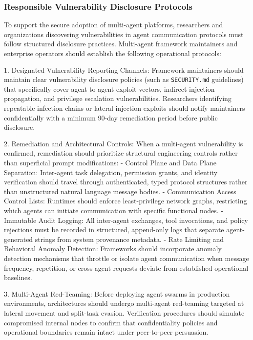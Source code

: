 \documentclass[11pt,a4paper]{article}
\begin{document}
\subsubsection{Responsible Vulnerability Disclosure Protocols}
To support the secure adoption of multi-agent platforms, researchers and organizations discovering vulnerabilities in agent communication protocols must follow structured disclosure practices. Multi-agent framework maintainers and enterprise operators should establish the following operational protocols:

1. Designated Vulnerability Reporting Channels:
Framework maintainers should maintain clear vulnerability disclosure policies (such as \texttt{SECURITY.md} guidelines) that specifically cover agent-to-agent exploit vectors, indirect injection propagation, and privilege escalation vulnerabilities. Researchers identifying repeatable infection chains or lateral injection exploits should notify maintainers confidentially with a minimum 90-day remediation period before public disclosure.

2. Remediation and Architectural Controls:
When a multi-agent vulnerability is confirmed, remediation should prioritize structural engineering controls rather than superficial prompt modifications:
- Control Plane and Data Plane Separation: Inter-agent task delegation, permission grants, and identity verification should travel through authenticated, typed protocol structures rather than unstructured natural language message bodies.
- Communication Access Control Lists: Runtimes should enforce least-privilege network graphs, restricting which agents can initiate communication with specific functional nodes.
- Immutable Audit Logging: All inter-agent exchanges, tool invocations, and policy rejections must be recorded in structured, append-only logs that separate agent-generated strings from system provenance metadata.
- Rate Limiting and Behavioral Anomaly Detection: Frameworks should incorporate anomaly detection mechanisms that throttle or isolate agent communication when message frequency, repetition, or cross-agent requests deviate from established operational baselines.

3. Multi-Agent Red-Teaming:
Before deploying agent swarms in production environments, architectures should undergo multi-agent red-teaming targeted at lateral movement and split-task evasion. Verification procedures should simulate compromised internal nodes to confirm that confidentiality policies and operational boundaries remain intact under peer-to-peer persuasion.
\end{document}
